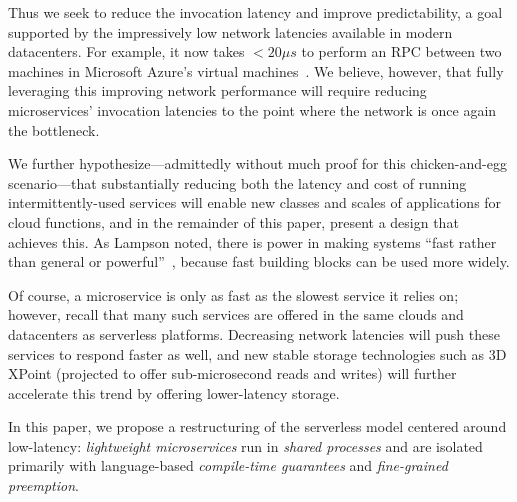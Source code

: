 Thus we seek to reduce the invocation latency and improve predictability, a
goal supported by the impressively low network latencies available in modern
datacenters. For example, it now takes $<20\mu{}s$ to perform an RPC between two
machines in
Microsoft Azure's virtual machines~\cite{Firestone:nsdi2018}. We believe,
however, that fully leveraging this improving network performance will require
reducing microservices' invocation latencies to the point where the network is
once again the bottleneck.

We further hypothesize---admittedly without much proof for this chicken-and-egg
scenario---that substantially reducing both the latency and cost of running
intermittently-used services will enable new classes and scales of applications
for cloud functions, and in the remainder of this paper, present a design that
achieves this.  As Lampson noted, there is power in making systems 
``fast rather than general or powerful''~\cite{Lampson1983}, because fast
building blocks can be used more widely.

Of course, a microservice is only as fast as the slowest service it relies on;
however, recall that many such services are offered in the same clouds and
datacenters as serverless platforms. Decreasing network latencies will push
these services to respond faster as well, and new stable storage
technologies such as 3D XPoint (projected to offer sub-microsecond reads and
writes) will further accelerate this trend by offering lower-latency storage.

In this paper, we propose a restructuring of the serverless model centered around
low-latency: \textit{lightweight microservices} run in \textit{shared processes}
and are isolated primarily with language-based \textit{compile-time guarantees} and
\textit{fine-grained preemption}.



